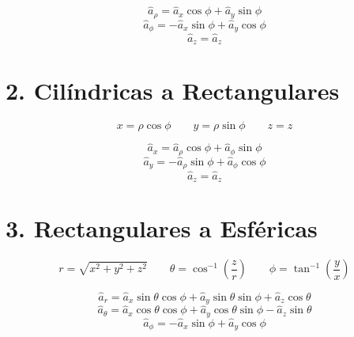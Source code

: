 \documentclass[11pt]{article}
\begin{document}
\begin{equation}
    \hat{a}_\rho = \hat{a}_x \cos \phi + \hat{a}_y \sin \phi
\end{equation}
\begin{equation}
    \hat{a}_\phi = -\hat{a}_x \sin \phi + \hat{a}_y \cos \phi
\end{equation}
\begin{equation}
    \hat{a}_z = \hat{a}_z
\end{equation}

\section{2. Cilíndricas a Rectangulares}
\begin{equation}
x = \rho \cos \phi \qquad 
y = \rho \sin \phi \qquad 
z = z
\end{equation}


\begin{equation}
    \hat{a}_x = \hat{a}_\rho \cos \phi + \hat{a}_\phi \sin \phi
\end{equation}
\begin{equation}
    \hat{a}_y = -\hat{a}_\rho \sin \phi + \hat{a}_\phi \cos \phi
\end{equation}
\begin{equation}
    \hat{a}_z = \hat{a}_z
\end{equation}

\section{3. Rectangulares a Esféricas}
\begin{equation}
r = \sqrt{x^2 + y^2 + z^2} \qquad 
\theta = \cos^{-1} \left( \frac{z}{r} \right) \qquad 
\phi = \tan^{-1} \left( \frac{y}{x} \right)
\end{equation}


\begin{equation}
    \hat{a}_r = \hat{a}_x \sin \theta \cos \phi + \hat{a}_y \sin \theta \sin \phi + \hat{a}_z \cos \theta
\end{equation}
\begin{equation}
    \hat{a}_\theta = \hat{a}_x \cos \theta \cos \phi + \hat{a}_y \cos \theta \sin \phi - \hat{a}_z \sin \theta
\end{equation}
\begin{equation}
    \hat{a}_\phi = -\hat{a}_x \sin \phi + \hat{a}_y \cos \phi
\end{equation}
\end{document}
